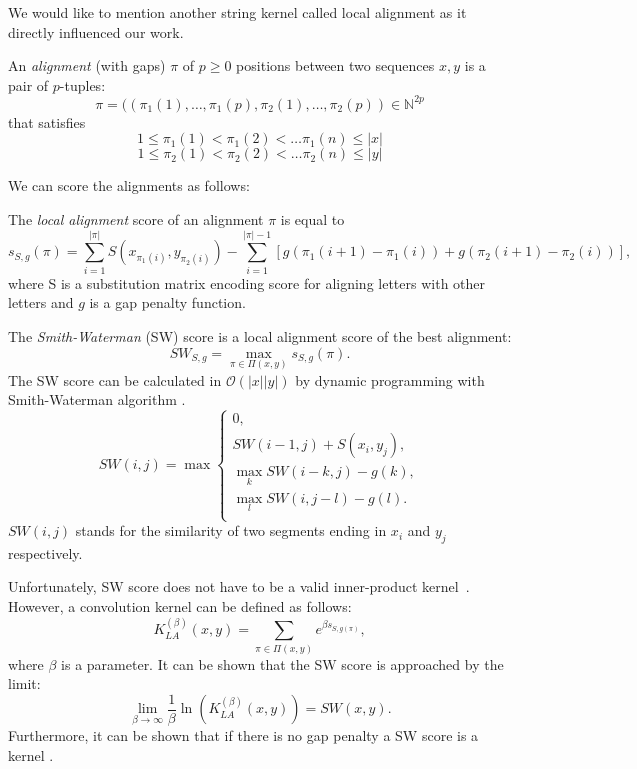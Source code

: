 We would like to mention another string kernel called local alignment as it directly influenced our work.
\begin{definition}
	An \emph{alignment} (with gaps) $\pi$ of $p \ge 0$ positions between two sequences $x,y$ is a pair of $p$-tuples:
	\begin{equation*}
	\pi = ((\pi_1(1),\dots,\pi_1(p),\pi_2(1),\dots,\pi_2(p)) \in \mathbb{N}^{2p}
	\end{equation*}	
	that satisfies
		\begin{equation*}
		1 \le \pi_1(1) < \pi_1(2) < \dots \pi_1(n) \le |x|
		\end{equation*}
		\begin{equation*}
		1 \le \pi_2(1) < \pi_2(2) < \dots \pi_2(n) \le |y|
		\end{equation*}
\end{definition}
We can score the alignments as follows:
\begin{definition}
The \emph{local alignment} score of an alignment $\pi$ is equal to
\begin{equation*}
s_{S,g}(\pi) = \sum_{i=1}^{|\pi|}S(x_{\pi_1(i)},y_{\pi_2(i)}) - \sum_{i=1}^{|\pi|-1}
[g(\pi_1(i+1)-\pi_1(i))+g(\pi_2(i+1)-\pi_2(i))],
\end{equation*}
where S is a substitution matrix encoding score for aligning letters with other letters and $g$ is a gap penalty function.
\end{definition}
The \emph{Smith-Waterman} (SW) score is a local alignment score of the best alignment:
\begin{equation*}
SW_{S,g} = \max_{\pi \in \Pi(x,y)}s_{S,g}(\pi).
\end{equation*}
The SW score can be calculated in $\mathcal{O}(|x||y|)$ by dynamic programming with Smith-Waterman algorithm \cite{smithWaterman}.
\begin{equation}
SW(i,j)= \max
	\begin{cases}
	0, \\
	SW(i-1,j)+S(x_i, y_j), \\
	\max_k{SW(i-k,j)-g(k)}, \\
	\max_l{SW(i,j-l)-g(l)}. \\
	\end{cases}
\end{equation}
$SW(i,j)$ stands for the similarity of two segments ending in $x_i$ and $y_j$ respectively.

Unfortunately, SW score does not have to be a valid inner-product kernel~\cite{smithWatermanKernel}. However, a convolution kernel can be defined as follows:
\begin{equation}
K_{LA}^{(\beta)}(x,y) = \sum_{\pi \in \Pi(x,y)}e^{\beta s_{S,g(\pi)}},
\end{equation}
where $\beta$ is a parameter. It can be shown that the SW score is approached by the limit:
\begin{equation}
\lim_{\beta \rightarrow \infty} \frac{1}{\beta}\ln(K_{LA}^{(\beta)}(x,y)) = SW(x,y).
\end{equation}
 Furthermore, it can be shown that if there is no gap penalty a SW score is a kernel \cite{swNoGapKernel}.

